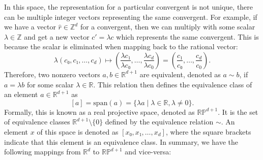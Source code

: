 In this space, the representation for a particular convergent is not unique,
there can be multiple integer vectors representing the same convergent.
For example, if we have a vector $\hat r ∈ ℤ^d$ for a convergent,
then we can multiply with some scalar $λ ∈ ℤ$ and get a new vector $c' = λ c$
which represents the same convergent.
This is because the scalar is eliminated when mapping back to the rational vector:
\[
  λ (c₀, c₁, …, c_d)
  ↦ \left(\frac{λ c₁}{λ c₀}, …, \frac{λ c_d}{λ c_0} \right)
  = \left(\frac{c₁}{c₀}, …, \frac{c_d}{c_0} \right).
\]
Therefore, two nonzero vectors $a, b ∈ ℝ^{d+1}$ are equivalent,
denoted as $a \sim b$, if $a = λ b$ for some scalar $λ ∈ ℝ$.
This relation then defines the equivalence class of an element $a ∈ ℝ^{d+1}$ as
\[
  [a] = \mathrm{span}(a) = \{ λ a \mid λ ∈ ℝ, λ ≠ 0 \}.
\]
Formally, this is known as a real projective space, denoted as $\mathbb{RP}^{d+1}$.
It is the set of equivalence classes $ℝ^{d+1} \setminus \{0\}$ defined by the
equivalence relation $\sim$.
An element $x$ of this space is denoted as $[x₀, x₁, …, x_d]$,
where the square brackets indicate that this element is an equivalence
class.
In summary, we have the following mappings from $ℝ^d$ to $\mathbb{RP}^{d+1}$
and vice-versa:

\begin{center}
\end{center}

